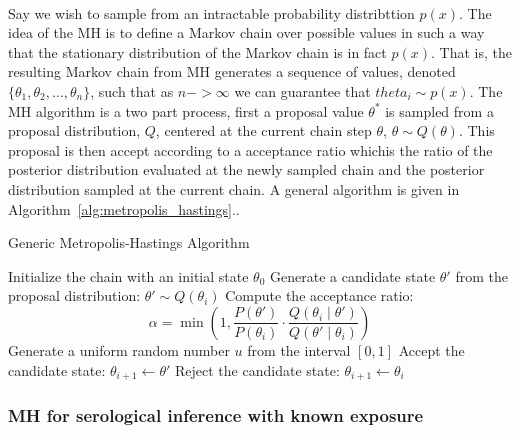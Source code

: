 \documentclass{article}
\begin{document}
\paragraph{}Say we wish to sample from an intractable probability distribttion $p(x)$. The idea of the MH is to define a Markov chain over possible values in such a way that the stationary distribution of the Markov chain is in fact $p(x)$. That is, the resulting Markov chain from MH generates a sequence of values, denoted $\{\theta_1, \theta_2, \dots,  \theta_n\}$, such that as $n -> \infty$ we can guarantee that $theta_i \sim p(x)$. The MH algorithm is a two part process, first a proposal value $\theta^*$ is sampled from a proposal distribution, $Q$, centered at the current chain step $\theta$, $\theta \sim Q(\theta)$. This proposal is then accept according to a acceptance ratio whichis the ratio of the posterior distribution evaluated at the newly sampled chain and the posterior distribution sampled at the current chain. A general algorithm is given in Algorithm~\ref{alg:metropolis_hastings}..
\begin{algorithm}
\caption{Generic Metropolis-Hastings Algorithm}
\label{alg:metropolis_hastings}
\begin{algorithmic}[1]
    \State Initialize the chain with an initial state $\theta_0$
        \State Generate a candidate state $\theta'$ from the proposal distribution: $\theta' \sim Q(\theta_i)$
        \State Compute the acceptance ratio:
        \[
        \alpha = \min\left(1, \frac{P(\theta')}{P(\theta_i)} \cdot \frac{Q(\theta_i \mid \theta')}{Q(\theta' \mid \theta_i)}\right)
        \]
        \State Generate a uniform random number $u$ from the interval $[0, 1]$
            \State Accept the candidate state: $\theta_{i+1} \leftarrow \theta'$
        \Else
            \State Reject the candidate state: $\theta_{i+1} \leftarrow \theta_i$
        \EndIf
    \EndFor
\end{algorithmic}
\end{algorithm}

\subsubsection{MH for serological inference with known exposure }
\end{document}
